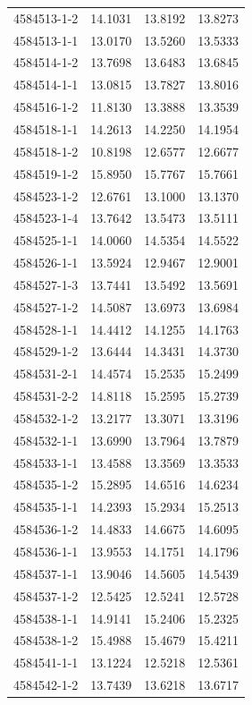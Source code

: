 \begin{longtable}{lrrr}
4584513-1-2 & 14.1031 & 13.8192 & 13.8273 \\
4584513-1-1 & 13.0170 & 13.5260 & 13.5333 \\
4584514-1-2 & 13.7698 & 13.6483 & 13.6845 \\
4584514-1-1 & 13.0815 & 13.7827 & 13.8016 \\
4584516-1-2 & 11.8130 & 13.3888 & 13.3539 \\
4584518-1-1 & 14.2613 & 14.2250 & 14.1954 \\
4584518-1-2 & 10.8198 & 12.6577 & 12.6677 \\
4584519-1-2 & 15.8950 & 15.7767 & 15.7661 \\
4584523-1-2 & 12.6761 & 13.1000 & 13.1370 \\
4584523-1-4 & 13.7642 & 13.5473 & 13.5111 \\
4584525-1-1 & 14.0060 & 14.5354 & 14.5522 \\
4584526-1-1 & 13.5924 & 12.9467 & 12.9001 \\
4584527-1-3 & 13.7441 & 13.5492 & 13.5691 \\
4584527-1-2 & 14.5087 & 13.6973 & 13.6984 \\
4584528-1-1 & 14.4412 & 14.1255 & 14.1763 \\
4584529-1-2 & 13.6444 & 14.3431 & 14.3730 \\
4584531-2-1 & 14.4574 & 15.2535 & 15.2499 \\
4584531-2-2 & 14.8118 & 15.2595 & 15.2739 \\
4584532-1-2 & 13.2177 & 13.3071 & 13.3196 \\
4584532-1-1 & 13.6990 & 13.7964 & 13.7879 \\
4584533-1-1 & 13.4588 & 13.3569 & 13.3533 \\
4584535-1-2 & 15.2895 & 14.6516 & 14.6234 \\
4584535-1-1 & 14.2393 & 15.2934 & 15.2513 \\
4584536-1-2 & 14.4833 & 14.6675 & 14.6095 \\
4584536-1-1 & 13.9553 & 14.1751 & 14.1796 \\
4584537-1-1 & 13.9046 & 14.5605 & 14.5439 \\
4584537-1-2 & 12.5425 & 12.5241 & 12.5728 \\
4584538-1-1 & 14.9141 & 15.2406 & 15.2325 \\
4584538-1-2 & 15.4988 & 15.4679 & 15.4211 \\
4584541-1-1 & 13.1224 & 12.5218 & 12.5361 \\
4584542-1-2 & 13.7439 & 13.6218 & 13.6717 \\

\end{longtable}
